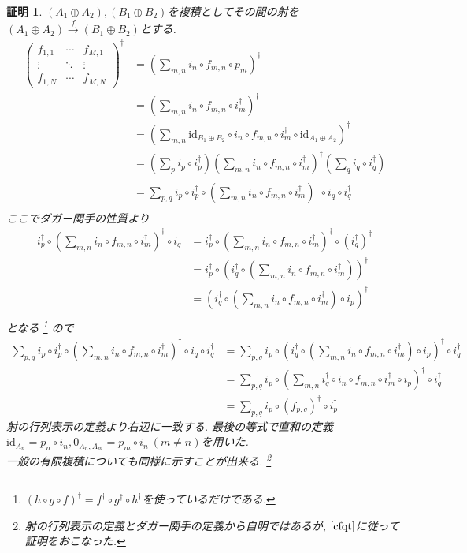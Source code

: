 \documentclass[a4paper,12pt]{ltjsarticle}
\theoremstyle{break}
\newtheorem*{prf}{証明}
\newcommand{\xr}[1]{\xrightarrow{#1}}
\newcommand{\id}{\mathrm{id}}
\newcommand{\ci}{\circ}
\newcommand{\da}{\dagger}
\newcommand{\opl}{\oplus}
\numberwithin{equation}{section}
\begin{document}
\begin{prf}
  $(A_1 \opl A_2), (B_1 \opl B_2)$を複積としてその間の射を$(A_1 \opl A_2) \xr{f} (B_1 \opl B_2)$とする. 
  \begin{align*}
      \begin{pmatrix}
      f_{1,1} & \cdots & f_{M,1} \\
      \vdots & \ddots & \vdots \\
      f_{1,N} & \cdots  & f_{M,N}
      \end{pmatrix}^\da
    &= \left( \sum_{m,n} i_n \ci f_{m,n} \ci p_m \right)^\da \\
    &= \left( \sum_{m,n} i_n \ci f_{m,n} \ci i_m^\da \right)^\da \\
    &= \left( \sum_{m,n} \id_{B_1 \opl B_2} \ci i_n \ci f_{m,n} \ci i_m^\da \ci \id_{A_1 \opl A_2}\right)^\da \\
    &= \left( \sum_p i_p \ci i_p^\da \right) \left( \sum_{m,n} i_n \ci f_{m,n} \ci i_m^\da \right)^\da \left( \sum_q i_q \ci i_q^\da \right) \\
    &= \sum_{p,q} i_p \ci i_p^\da \ci \left( \sum_{m,n} i_n \ci f_{m,n} \ci i_m^\da \right)^\da \ci i_q \ci i_q^\da \\
  \end{align*}
  ここでダガー関手の性質より
  \begin{align*}
    i_p^\da \ci \left( \sum_{m,n} i_n \ci f_{m,n} \ci i_m^\da \right)^\da \ci i_q 
    &= i_p^\da \ci \left( \sum_{m,n} i_n \ci f_{m,n} \ci i_m^\da \right)^\da \ci (i_q^\da)^\da \\
    &= i_p^\da \ci \left( i_q^\da \ci \left( \sum_{m,n} i_n \ci f_{m,n} \ci i_m^\da \right) \right)^\da \\
    &= \left( i_q^\da \ci \left( \sum_{m,n} i_n \ci f_{m,n} \ci i_m^\da \right) \ci i_p \right)^\da \\
  \end{align*}
  となる
  \footnote{
    $(h \ci g \ci f)^\da=f^\da \ci g^\da \ci h^\da$を使っているだけである. 
  }
  ので
  \begin{align*}
    \sum_{p,q} i_p \ci i_p^\da \ci \left( \sum_{m,n} i_n \ci f_{m,n} \ci i_m^\da \right)^\da \ci i_q \ci i_q^\da 
    &= \sum_{p,q} i_p \ci \left( i_q^\da \ci \left( \sum_{m,n} i_n \ci f_{m,n} \ci i_m^\da \right) \ci i_p \right)^\da \ci i_q^\da \\
    &= \sum_{p,q} i_p \ci \left( \sum_{m,n} i_q^\da \ci i_n \ci f_{m,n} \ci i_m^\da \ci i_p \right)^\da \ci i_q^\da \\
    &= \sum_{p,q} i_p \ci (f_{p,q})^\da \ci i_p^\da 
  \end{align*}
  射の行列表示の定義より右辺に一致する. 
  最後の等式で直和の定義$\id_{A_n}=p_n \ci i_n, 0_{A_n,A_m}=p_m \ci i_n~(m \neq n)$を用いた. \\
  一般の有限複積についても同様に示すことが出来る.
  \footnote{
    射の行列表示の定義とダガー関手の定義から自明ではあるが, $\cite{cfqt}$に従って証明をおこなった. 
  } 
\end{prf}
\end{document}
